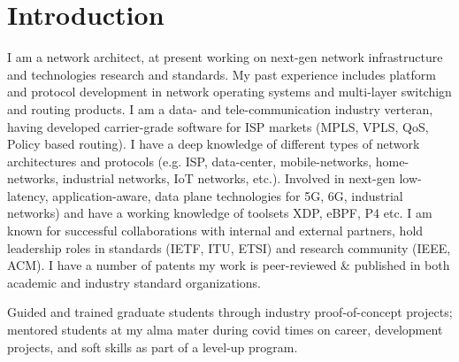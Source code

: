 \documentclass[11pt,a4paper,sans]{moderncv} %
\begin{document}
\makecvtitle %
\vspace{-13mm}
\section{Introduction}
\cvitem{} {I am  a network architect, at present working on next-gen network infrastructure and technologies research and standards. My past experience includes platform and protocol development in network operating systems and multi-layer switchign and routing products.}
 {I am a data- and tele-communication industry  verteran, having developed carrier-grade software for ISP markets (MPLS, VPLS, QoS, Policy based routing). I have a deep knowledge of different types of network architectures and protocols (e.g. ISP, data-center, mobile-networks, home-networks, industrial networks, IoT networks, etc.). Involved in next-gen low-latency, application-aware, data plane technologies for 5G, 6G, industrial networks) and have a working knowledge of toolsets XDP, eBPF, P4 etc. I am known for successful collaborations with internal and external partners, hold leadership roles in standards (IETF, ITU, ETSI) and research community (IEEE, ACM). \newline I have a number of patents my work is peer-reviewed \& published in both academic and industry standard organizations.}

  {Guided and trained graduate students through industry proof-of-concept projects; mentored students at my alma mater during covid times on career, development projects, and soft skills as part of a level-up program.}

\end{document}
